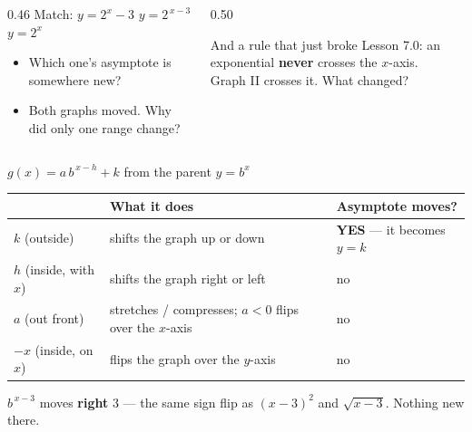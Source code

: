 \documentclass[aspectratio=169, 11pt]{beamer}
\begin{document}
\begin{frame}[t, plain]
\begin{columns}[T]
    \begin{column}{0.46\textwidth}
      \footnotesize
      Match: \quad $y=2^{x}-3$ \quad $y=2^{\,x-3}$ \quad $y=2^{x}$
      \begin{itemize}\setlength{\itemsep}{3pt}
        \item Which one's asymptote is somewhere new?
        \item Both graphs moved. Why did only one range change?
      \end{itemize}
    \end{column}
    \begin{column}{0.50\textwidth}
      \begin{block}{And a rule that just broke}
        Lesson 7.0: an exponential \textbf{never} crosses the $x$-axis. \\[3pt]
        Graph II crosses it. What changed?
      \end{block}
    \end{column}
  \end{columns}
\end{frame}

\begin{frame}[t, plain]
  \begin{center}
    \Large $g(x) = a\,b^{\,x-h} + k$ \qquad from the parent \qquad $y=b^{x}$
  \end{center}
  \vspace{6pt}
  \begin{center}
  \footnotesize
  \renewcommand{\arraystretch}{1.35}
  \begin{tabular}{|l|l|l|}
  \hline
  & \textbf{What it does} & \textbf{Asymptote moves?} \\
  \hline
  $k$ (outside) & shifts the graph up or down & \textbf{YES} --- it becomes $y=k$ \\
  $h$ (inside, with $x$) & shifts the graph right or left & no \\
  $a$ (out front) & stretches / compresses; $a<0$ flips over the $x$-axis & no \\
  $-x$ (inside, on $x$) & flips the graph over the $y$-axis & no \\
  \hline
  \end{tabular}
  \end{center}
  \vspace{8pt}
  \begin{center}
    {\footnotesize $b^{\,x-3}$ moves \textbf{right} $3$ --- the same sign flip as $(x-3)^{2}$ and
    $\sqrt{x-3}$. Nothing new there.}
  \end{center}
\end{frame}
\end{document}
